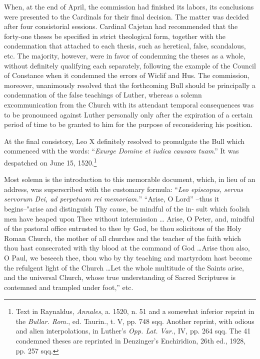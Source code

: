 When, at the end of April, the commission had finished its labors,
its conclusions were presented to the Cardinals for their final decision.
The matter was decided after four consistorial sessions. Cardinal Cajetan
had recommended that the forty-one theses be specified
in strict theological form, together with the condemnation that attached
to each thesis, such as heretical, false, scandalous, etc. The majority,
however, were in favor of condemning the theses as a whole,
without definitely qualifying each separately, following the example
of the Council of Constance when it condemned the errors of Wiclif
and Hus. The commission, moreover, unanimously resolved that the
forthcoming Bull should be principally a condemnation of the false
teachings of Luther, whereas a solemn excommunication from the
Church with its attendant temporal consequences was to be pronounced against
Luther personally only after the expiration of a
certain period of time to be granted to him for the purpose of reconsidering
his position.

At the final consistory, Leo X definitely resolved to promulgate the
Bull which commenced with the words: “\textit{Exurge Domine et iudica
causam tuam}.” It was despatched on June 15, 1520.\footnote
{Text in Raynaldus, \textit{Annales}, a. 1520, n. 51 and a somewhat inferior reprint in the
\textit{Bullar. Rom.}, ed. Taurin., t. V, pp. 748 sqq. Another reprint, with odious and alien interpolations,
in Luther’s \textit{Opp. Lat. Var.}, IV, pp. 264 sqq. The 41 condemned theses are
reprinted in Denzinger’s Enchiridion, 26th ed., 1928, pp. 257 sqq.}


Most solemn is the introduction to this memorable document, which, in
lieu of an address, was superscribed with the customary formula: ``\textit{Leo episcopus,
servus servorum Dei, ad perpetuam rei memoriam.}” “Arise, O Lord”
--thus it begins--"arise and distinguish Thy cause, be mindful of the in-
sult which foolish men have heaped upon Thee without intermission \dots
Arise, O Peter, and, mindful of the pastoral office entrusted to thee by God,
be thou solicitous of the Holy Roman Church, the mother of all churches
and the teacher of the faith which thou hast consecrated with thy blood
at the command of God \dots Arise thou also, O Paul, we beseech thee,
thou who by thy teaching and martyrdom hast become the refulgent light
of the Church \dots Let the whole multitude of the Saints arise, and the
universal Church, whose true understanding of Sacred Scriptures is
contemned and trampled under foot,” etc.

